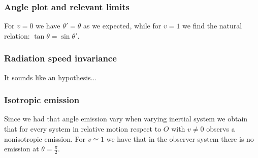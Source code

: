 \documentclass[main.tex]{subfiles}
\begin{document}
\subsubsection{Angle plot and relevant limits}
For $v=0$ we have $\theta'=\theta$ as we expected, while for $v=1$ we find the natural relation: $\tan\theta=\sin\theta'$.
\subsubsection{Radiation speed invariance}
It sounds like an hypothesis...
\subsubsection{Isotropic emission}

Since we had that angle emission vary when varying inertial system we obtain that for every system in relative motion respect to $O$ with $v\neq 0$ observs a nonisotropic emission. For $v\simeq 1$ we have that in the observer system there is no emission at $\theta=\frac{\pi}{2}$.
\end{document}
